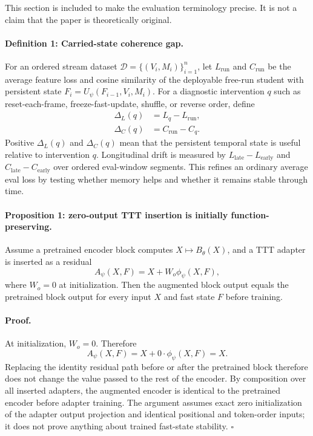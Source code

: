 \documentclass[10pt]{article}
\begin{document}
This section is included to make the evaluation terminology precise.  It is
not a claim that the paper is theoretically original.

\paragraph{Definition 1: Carried-state coherence gap.}
For an ordered stream dataset $\mathcal{D}=\{(V_i,M_i)\}_{i=1}^n$, let
$L_{\mathrm{run}}$ and $C_{\mathrm{run}}$ be the average feature loss and
cosine similarity of the deployable free-run student with persistent state
$F_i=U_\psi(F_{i-1},V_i,M_i)$.  For a diagnostic intervention $q$ such as
reset-each-frame, freeze-fast-update, shuffle, or reverse order, define
\begin{align}
  \Delta_L(q) &= L_q - L_{\mathrm{run}}, \\
  \Delta_C(q) &= C_{\mathrm{run}} - C_q.
\end{align}
Positive $\Delta_L(q)$ and $\Delta_C(q)$ mean that the persistent temporal
state is useful relative to intervention $q$.  Longitudinal drift is measured
by $L_{\mathrm{late}}-L_{\mathrm{early}}$ and
$C_{\mathrm{late}}-C_{\mathrm{early}}$ over ordered eval-window segments.
This refines an ordinary average eval loss by testing whether memory helps and
whether it remains stable through time.

\paragraph{Proposition 1: zero-output TTT insertion is initially
function-preserving.}
Assume a pretrained encoder block computes $X \mapsto B_\theta(X)$, and a TTT
adapter is inserted as a residual
\begin{equation}
  A_\psi(X,F) = X + W_o \phi_\psi(X,F),
\end{equation}
where $W_o=0$ at initialization.  Then the augmented block output equals the
pretrained block output for every input $X$ and fast state $F$ before training.

\paragraph{Proof.}
At initialization, $W_o=0$.  Therefore
\[
  A_\psi(X,F) = X + 0\cdot \phi_\psi(X,F) = X.
\]
Replacing the identity residual path before or after the pretrained block
therefore does not change the value passed to the rest of the encoder.  By
composition over all inserted adapters, the augmented encoder is identical to
the pretrained encoder before adapter training.  The argument assumes exact
zero initialization of the adapter output projection and identical positional
and token-order inputs; it does not prove anything about trained fast-state
stability.
\hfill$\square$
\end{document}
